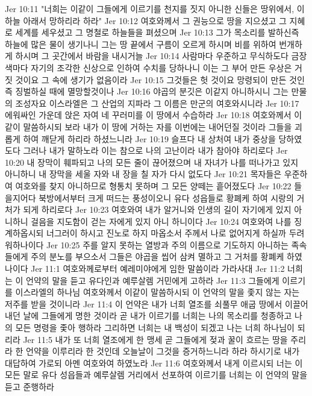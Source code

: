 Jer 10:11  "너희는 이같이 그들에게 이르기를 천지를 짓지 아니한 신들은 땅위에서, 이 하늘 아래서 망하리라 하라"
Jer 10:12  여호와께서 그 권능으로 땅을 지으셨고 그 지혜로 세계를 세우셨고 그 명철로 하늘들을 펴셨으며
Jer 10:13  그가 목소리를 발하신즉 하늘에 많은 물이 생기나니 그는 땅 끝에서 구름이 오르게 하시며 비를 위하여 번개하게 하시며 그 곳간에서 바람을 내시거늘
Jer 10:14  사람마다 우준하고 무식하도다 금장색마다 자기의 조각한 신상으로 인하여 수치를 당하나니 이는 그 부어 만든 우상은 거짓 것이요 그 속에 생기가 없음이라
Jer 10:15  그것들은 헛 것이요 망령되이 만든 것인즉 징벌하실 때에 멸망할것이나
Jer 10:16  야곱의 분깃은 이같지 아니하시니 그는 만물의 조성자요 이스라엘은 그 산업의 지파라 그 이름은 만군의 여호와시니라
Jer 10:17  에워싸인 가운데 앉은 자여 네 꾸러미를 이 땅에서 수습하라
Jer 10:18  여호와께서 이같이 말씀하시되 보라 내가 이 땅에 거하는 자를 이번에는 내어던질 것이라 그들을 괴롭게 하여 깨닫게 하리라 하셨느니라
Jer 10:19  슬프다 내 상처여 내가 중상을 당하였도다 그러나 내가 말하노라 이는 참으로 나의 고난이라 내가 참아야 하리로다
Jer 10:20  내 장막이 훼파되고 나의 모든 줄이 끊어졌으며 내 자녀가 나를 떠나가고 있지 아니하니 내 장막을 세울 자와 내 장을 칠 자가 다시 없도다
Jer 10:21  목자들은 우준하여 여호와를 찾지 아니하므로 형통치 못하며 그 모든 양떼는 흩어졌도다
Jer 10:22  들을지어다 북방에서부터 크게 떠드는 풍성이오니 유다 성읍들로 황폐케 하여 시랑의 거처가 되게 하리로다
Jer 10:23  여호와여 내가 알거니와 인생의 길이 자기에게 있지 아니하니 걸음을 지도함이 걷는 자에게 있지 아니 하니이다
Jer 10:24  여호와여 나를 징계하옵시되 너그러이 하시고 진노로 하지 마옵소서 주께서 나로 없어지게 하실까 두려워하나이다
Jer 10:25  주를 알지 못하는 열방과 주의 이름으로 기도하지 아니하는 족속들에게 주의 분노를 부으소서 그들은 야곱을 씹어 삼켜 멸하고 그 거처를 황폐케 하였나이다
Jer 11:1  여호와께로부터 예레미야에게 임한 말씀이라 가라사대
Jer 11:2  너희는 이 언약의 말을 듣고 유다인과 예루살렘 거민에게 고하라
Jer 11:3  그들에게 이르기를 이스라엘의 하나님 여호와께서 이같이 말씀하시되 이 언약의 말을 좇지 않는 자는 저주를 받을 것이니라
Jer 11:4  이 언약은 내가 너희 열조를 쇠풀무 애굽 땅에서 이끌어 내던 날에 그들에게 명한 것이라 곧 내가 이르기를 너희는 나의 목소리를 청종하고 나의 모든 명령을 좇아 행하라 그리하면 너희는 내 백성이 되겠고 나는 너희 하나님이 되리라
Jer 11:5  내가 또 너희 열조에게 한 맹세 곧 그들에게 젖과 꿀이 흐르는 땅을 주리라 한 언약을 이루리라 한 것인데 오늘날이 그것을 증거하느니라 하라 하시기로 내가 대답하여 가로되 아멘 여호와여 하였노라
Jer 11:6  여호와께서 내게 이르시되 너는 이 모든 말로 유다 성읍들과 예루살렘 거리에서 선포하여 이르기를 너희는 이 언약의 말을 듣고 준행하라
